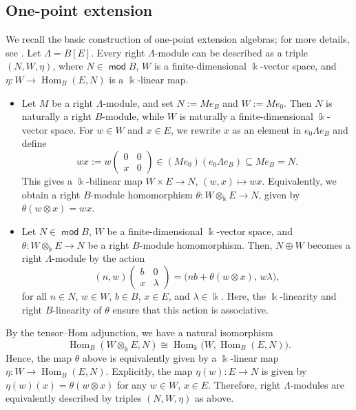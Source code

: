 \documentclass[a4,12pt]{amsart}
\numberwithin{equation}{section} %
\def\Hom{\operatorname{Hom}} %
\def\mod{\operatorname{\mathsf{mod}}}
\theoremstyle{definition} %
\begin{document}
\subsection{One-point extension}
We recall the basic construction of one-point extension algebras; for more details, see \cite[Chapter~IV]{SS-Vol-3}. Let $\Lambda=B[E]$. Every right $\Lambda$-module can be described as a triple $(N,W,\eta)$, where $N\in\mod B$, $W$ is a finite-dimensional $\Bbbk$-vector space, and $\eta\colon W\to \Hom_B(E,N)$ is a $\Bbbk$-linear map. 
\begin{itemize}
\item[($\Rightarrow$)]
Let $M$ be a right $\Lambda$-module, and set $N:=Me_B$ and $W:=Me_0$. Then $N$ is naturally a right $B$-module, while $W$ is naturally a finite-dimensional $\Bbbk$-vector space. For $w\in W$ and $x\in E$, we rewrite $x$ as an element in $e_0\Lambda e_B$ and define
\[
wx := w
\begin{pmatrix}
0&0\\
x&0
\end{pmatrix}
\in (Me_0)(e_0\Lambda e_B)\subseteq Me_B =N.
\] 
This gives a $\Bbbk$-bilinear map $W\times E\to N$, $(w,x)\mapsto wx$. Equivalently, we obtain a right $B$-module homomorphism $\theta\colon W\otimes_{\Bbbk}E\to N$, given by $\theta(w\otimes x)=wx$. 

\item[($\Leftarrow$)] Let $N\in\mod B$, $W$ be a finite-dimensional $\Bbbk$-vector space, and $\theta\colon W\otimes_{\Bbbk}E\to N$ be a right $B$-module homomorphism. Then, $N\oplus W$ becomes a right $\Lambda$-module by the action
\[
(n,w)
\begin{pmatrix}
b&0\\
x&\lambda
\end{pmatrix}
=
\bigl(nb+\theta(w\otimes x),\,w\lambda\bigr),
\]
for all $n\in N$, $w\in W$, $b\in B$, $x\in E$, and $\lambda\in\Bbbk$. Here, the $\Bbbk$-linearity and right $B$-linearity of $\theta$ ensure that this action is associative.
\end{itemize}
By the tensor--Hom adjunction, we have a natural isomorphism
\[
\Hom_B(W\otimes_{\Bbbk}E,N)
\cong
\Hom_{\Bbbk}\bigl(W,\Hom_B(E,N)\bigr).
\] 
Hence, the map $\theta$ above is equivalently given by a $\Bbbk$-linear map $\eta\colon W\to \Hom_B(E,N)$. Explicitly, the map $\eta(w)\colon E\to N$ is given by $\eta(w)(x)=\theta(w\otimes x)$ for any $w\in W$, $x\in E$. Therefore, right $\Lambda$-modules are equivalently described by triples $(N,W,\eta)$ as above.
\end{document}
